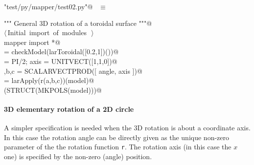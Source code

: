 \documentclass[11pt,oneside]{article}	%
\begin{document}
\begin{flushleft} \small \label{scrap44}
\verb@"test/py/mapper/test02.py"@\nobreak\ {\footnotesize {} }$\equiv$
\vspace{-1ex}
\begin{list}{}{} \item
\mbox{}\verb@""" General 3D rotation of a toroidal surface """@\\
\mbox{}\verb@@\hbox{$\langle\,$Initial import of modules\nobreak\ {\footnotesize {}}$\,\rangle$}\verb@@\\
\mbox{}\verb@from mapper import *@\\
\mbox{}\verb@model = checkModel(larToroidal([0.2,1])())@\\
\mbox{}\verb@angle = PI/2; axis = UNITVECT([1,1,0])@\\
\mbox{}\verb@a,b,c = SCALARVECTPROD([ angle, axis ])@\\
\mbox{}\verb@model = larApply(r(a,b,c))(model)@\\
\mbox{}\verb@VIEW(STRUCT(MKPOLS(model)))@\\
\mbox{}\verb@@{\NWsep}
\end{list}
\vspace{-2ex}
\end{flushleft}


\paragraph{3D elementary rotation of a 2D circle}
A simpler specification is needed when the 3D rotation is about a coordinate axis. In this case the rotation angle can be directly given as the unique non-zero parameter of the the rotation function \texttt{r}. The rotation axis (in this case the $x$ one) is specified by the non-zero (angle) position.
\end{document}
